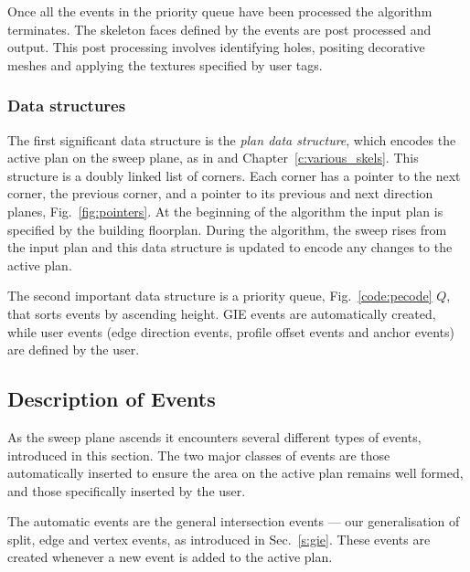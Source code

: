 Once all the events in the priority queue have been processed the algorithm terminates. The skeleton faces defined by the events are post processed and output. This post processing involves identifying holes, positing decorative meshes and applying the textures specified by user tags. 


\subsubsection{Data structures}

The first significant data structure is the \emph{plan data structure}, which encodes the active plan on the sweep plane, as in \cite{Felkel:1998:SKI} and Chapter~\ref{c:various_skels}. This structure is a doubly linked list of corners. Each corner has a pointer to the next corner, the previous corner, and a pointer to its previous and next direction planes, Fig.~\ref{fig:pointers}. 
At the beginning of the algorithm the input plan is specified by the building floorplan. During the algorithm, the sweep rises from the input plan and this data structure is updated to encode any changes to the active plan. 

The second important data structure is a priority queue, Fig.~\ref{code:pecode} $Q$,  that sorts events by ascending height. GIE events are automatically created, while user events (edge direction events, profile offset events and anchor events) are defined by the user.

\subsection{Description of Events}
\label{s:desc_pe_events}

As the sweep plane ascends it encounters several different types of events, introduced in this section. The two major classes of events are those automatically inserted to ensure the area on the active plan remains well formed, and those specifically inserted by the user.

The automatic events are the general intersection events --- our generalisation of split, edge\cite{Felkel:1998:SKI} and vertex events\cite{Epp:98}, as introduced in Sec.~\ref{s:gie}. These events are created whenever a new event is added to the active plan.

